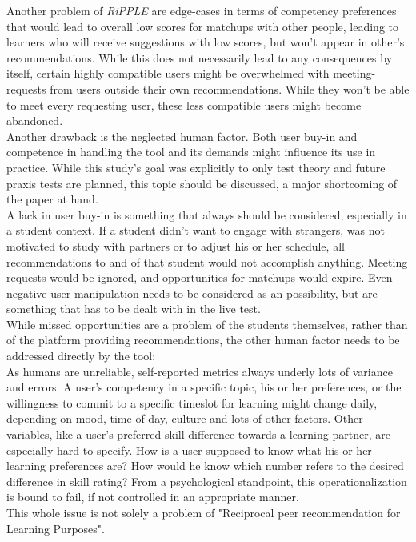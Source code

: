 \documentclass[conference]{IEEEtran}
\begin{document}
Another problem of \textit{RiPPLE} are edge-cases in terms of competency preferences that would lead to overall low scores for matchups with other people, leading to learners who will receive suggestions with low scores, but won't appear in other's recommendations. While this does not necessarily lead to any consequences by itself, certain highly compatible users might be overwhelmed with meeting-requests from users outside their own recommendations. While they won't be able to meet every requesting user, these less compatible users might become abandoned.\\
Another drawback is the neglected human factor. Both user buy-in and competence in handling the tool and its demands might influence its use in practice. While this study's goal was explicitly to only test theory and future praxis tests are planned, this topic should be discussed, a major shortcoming of the paper at hand.\\
A lack in user buy-in is something that always should be considered, especially in a student context. If a student didn't want to engage with strangers, was not motivated to study with partners or to adjust his or her schedule, all recommendations to and of that student would not accomplish anything. Meeting requests would be ignored, and opportunities for matchups would expire. Even negative user manipulation needs to be considered as an possibility, but are something that has to be dealt with in the live test.\\
While missed opportunities are a problem of the students themselves, rather than of the platform providing recommendations, the other human factor needs to be addressed directly by the tool:\\
As humans are unreliable, self-reported metrics always underly lots of variance and errors. A user's competency in a specific topic, his or her preferences, or the willingness to commit to a specific timeslot for learning might change daily, depending on mood, time of day, culture and lots of other factors. \cite{lee2002cultural} \cite{sorensen2008measuring} Other variables, like a user's preferred skill difference towards a learning partner, are especially hard to specify. How is a user supposed to know what his or her learning preferences are? How would he know which number refers to the desired difference in skill rating? From a psychological standpoint, this operationalization is bound to fail, if not controlled in an appropriate manner. \cite{gonyea2005self}\\
This whole issue is not solely a problem of "Reciprocal peer recommendation for Learning Purposes".
\end{document}
